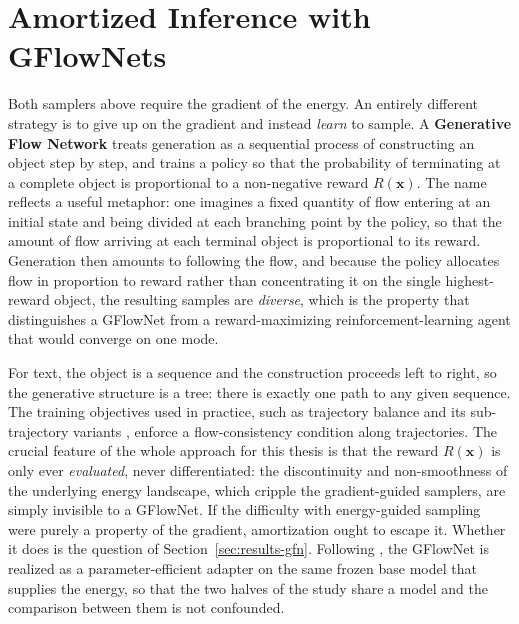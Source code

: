 \section{Amortized Inference with GFlowNets}
\label{sec:bg-gflownet}

Both samplers above require the gradient of the energy. An entirely different strategy is to give up on the gradient and instead \emph{learn} to sample. A \textbf{Generative Flow Network} \citep{bengio2021flow, bengio2023gflownet} treats generation as a sequential process of constructing an object step by step, and trains a policy so that the probability of terminating at a complete object is proportional to a non-negative reward $R(\bm{x})$. The name reflects a useful metaphor: one imagines a fixed quantity of flow entering at an initial state and being divided at each branching point by the policy, so that the amount of flow arriving at each terminal object is proportional to its reward. Generation then amounts to following the flow, and because the policy allocates flow in proportion to reward rather than concentrating it on the single highest-reward object, the resulting samples are \emph{diverse}, which is the property that distinguishes a GFlowNet from a reward-maximizing reinforcement-learning agent that would converge on one mode.

For text, the object is a sequence and the construction proceeds left to right, so the generative structure is a tree: there is exactly one path to any given sequence. The training objectives used in practice, such as trajectory balance and its sub-trajectory variants \citep{malkin2022trajectory, madan2023learning}, enforce a flow-consistency condition along trajectories. The crucial feature of the whole approach for this thesis is that the reward $R(\bm{x})$ is only ever \emph{evaluated}, never differentiated: the discontinuity and non-smoothness of the underlying energy landscape, which cripple the gradient-guided samplers, are simply invisible to a GFlowNet. If the difficulty with energy-guided sampling were purely a property of the gradient, amortization ought to escape it. Whether it does is the question of Section~\ref{sec:results-gfn}. Following \citet{hu2024amortizing}, the GFlowNet is realized as a parameter-efficient adapter \citep{hu2022lora} on the same frozen base model that supplies the energy, so that the two halves of the study share a model and the comparison between them is not confounded.

